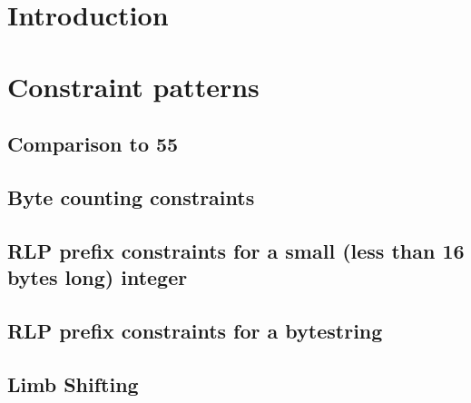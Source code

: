 \section{Introduction}

\section{Constraint patterns}
\subsection{Comparison to 55}                       
\subsection{Byte counting constraints}                         
\subsection{RLP prefix constraints for a small (less than 16 bytes long) integer}              
\subsection{RLP prefix constraints for a bytestring}              
\subsection{Limb Shifting} 